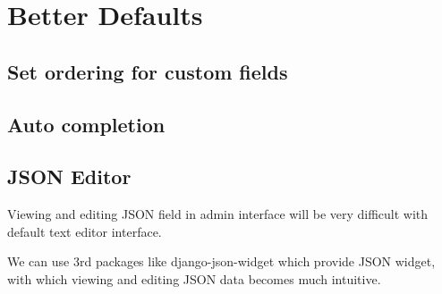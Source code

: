 \documentclass[letterpaper,12pt,english]{sphinxmanual}
\begin{document}


\chapter{Better Defaults}
\label{\detokenize{admin_better_defaults:better-defaults}}\label{\detokenize{admin_better_defaults::doc}}

\section{Set ordering for custom fields}
\label{\detokenize{admin_better_defaults:set-ordering-for-custom-fields}}
\begin{sphinxVerbatim}[commandchars=\\\{\}]
  
     
  
\end{sphinxVerbatim}


\section{Auto completion}
\label{\detokenize{admin_better_defaults:auto-completion}}

\section{JSON Editor}
\label{\detokenize{admin_better_defaults:json-editor}}
Viewing and editing JSON field in admin interface will be very difficult with default text editor interface.

We can use 3rd packages like django-json-widget which provide JSON widget, with which viewing and editing JSON data becomes much intuitive.

\begin{sphinxVerbatim}[commandchars=\\\{\}]
   
   
   
   


 
      
          
\end{sphinxVerbatim}
\end{document}
